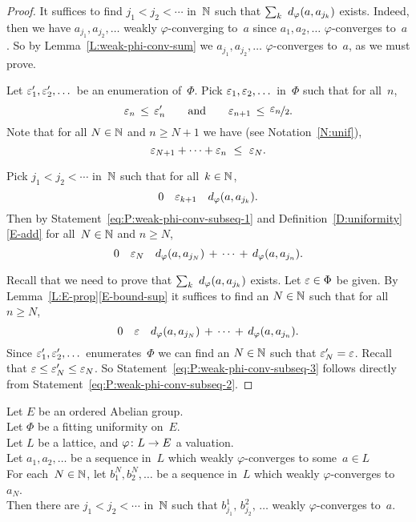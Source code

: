\documentclass[main.tex]{subfiles}
\begin{document}
\begin{proof}
It suffices to find $j_1<j_2<\dotsb$ in~$\mathbb{N}$ such that
$\sum_k \ \ld\varphi(a,a_{j_k})$ exists.
Indeed,
then we have $a_{j_1},a_{j_2},\dotsc$
weakly $\varphi$-converging to~$a$
since $a_1,a_2,\dotsc$ $\varphi$-converges to~$a$.
So by Lemma~\ref{L:weak-phi-conv-sum} we 
$a_{j_1},a_{j_2},\dotsc$ $\varphi$-converges to~$a$, as we must prove.

Let $\varepsilon_1',\varepsilon_2',\dotsc$ be an enumeration of~$\Phi$.
Pick $\varepsilon_1,\varepsilon_2,\dotsc$ in~$\Phi$ such that for all~$n$,
\begin{equation*}
\varepsilon_{n} \,\leq\, \varepsilon_n ' \qquad\text{and}\qquad  \varepsilon_{n+1}\,\leq\,\smash{\nicefrac{\textstyle{\varepsilon_{n}}}{2}}.
\end{equation*}
Note that for all $N\in \mathbb{N}$ and $n\geq N+1$
we have
(see Notation~\ref{N:unif}),
\begin{equation}
\label{eq:P:weak-phi-conv-subseq-1}
\varepsilon_{N+1} + \dotsb + \varepsilon_{n} \ \leq\  \varepsilon_N.
\end{equation}

Pick $j_1 < j_2 < \dotsb$ in~$\mathbb{N}$ such that for all~$k\in\mathbb{N}$, 
\begin{equation*}
0\quad\varepsilon_{k+1}\quad d_{\smash{\varphi}}(a, a_{j_k}).
\end{equation*}
Then by Statement~\eqref{eq:P:weak-phi-conv-subseq-1} 
and Definition~\ref{D:uniformity}\ref{E-add} for all~$N\in\mathbb{N}$ and $n\geq N$,
\begin{equation}
\label{eq:P:weak-phi-conv-subseq-2}
0\quad\varepsilon_{N}\quad 
d_{\smash{\varphi}}(a, a_{j_N}) \,+\, \dotsb \,+\, d_{\smash{\varphi}}(a,a_{j_n}).
\end{equation}

Recall that we need to prove that $\sum_k\ \ld\varphi(a,a_{j_k})$ exists.
Let $\varepsilon \in \Phi$ be given.
By Lemma~\ref{L:E-prop}\ref{E-bound-sup}
it suffices to find an $N\in\mathbb{N}$ such that for all~$n\geq N$,
\begin{equation}
\label{eq:P:weak-phi-conv-subseq-3}
0\quad\varepsilon\quad d_{\smash{\varphi}}(a,a_{j_N}) \,+\, \dotsb \,+\, d_{\smash{\varphi}}(a,a_{j_n}).
\end{equation}
Since $\varepsilon_1',\varepsilon_2',\dotsc$ enumerates~$\Phi$
we can find an $N\in \mathbb{N}$ such that $\varepsilon_N'=\varepsilon$.
Recall that $\varepsilon \leq \varepsilon_N' \leq \varepsilon_N$.
So Statement~\eqref{eq:P:weak-phi-conv-subseq-3}
follows directly from Statement~\eqref{eq:P:weak-phi-conv-subseq-2}.
\end{proof}
%
%
\begin{lem}
\label{L:phi-conv-diag}
Let $E$ be an ordered Abelian group.\\
Let $\Phi$ be a fitting uniformity on~$E$.\\
Let $L$ be a lattice, and $\varphi\colon L \rightarrow E$ a valuation.\\
Let $a_1,a_2,\dotsc$ be a sequence in~$L$
which weakly $\varphi$-converges to some~$a\in L$\\
For each~$N\in\mathbb{N}$, let $b^N_1, b^N_2, \dotsc$
be a sequence in~$L$ which weakly $\varphi$-converges to~$a_N$.\\
Then there are $j_1 < j_2 < \dotsb$ in~$\mathbb{N}$ such that
 $b^1_{j_1},\,b^2_{j_2},\,\dotsc$
weakly $\varphi$-converges to~$a$.
\end{lem}
\end{document}

